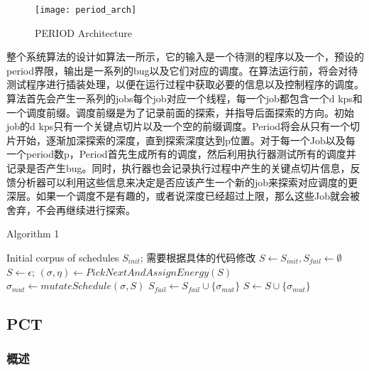 \begin{figure}[ht]
    \centering
    \texttt{[image: period\_arch]}
    \caption{\label{fig:period_arch}PERIOD Architecture}
\end{figure}

整个系统算法的设计如算法一所示，它的输入是一个待测的程序以及一个，预设的period界限，输出是一系列的bug以及它们对应的调度。在算法运行前，将会对待测试程序进行插装处理，以便在运行过程中获取必要的信息以及控制程序的调度。算法首先会产生一系列的jobs每个job对应一个线程，每一个job都包含一个d kps和一个调度前缀。调度前缀是为了记录前面的探索，并指导后面探索的方向。初始job的d kps只有一个关键点切片以及一个空的前缀调度。Period将会从只有一个切片开始，逐渐加深探索的深度，直到探索深度达到p位置。对于每一个Job以及每一个period数p，Period首先生成所有的调度，然后利用执行器测试所有的调度并记录是否产生bug。同时，执行器也会记录执行过程中产生的关键点切片信息，反馈分析器可以利用这些信息来决定是否应该产生一个新的job来探索对应调度的更深层。如果一个调度不是有趣的，或者说深度已经超过上限，那么这些Job就会被舍弃，不会再继续进行探索。

\begin{algorithm}[!ht]
\caption{Algorithm 1}
\label{power}
\begin{algorithmic}[1]
    \REQUIRE  Initial corpus of schedules $S_{init}$; %
    需要根据具体的代码修改
    \STATE $S \leftarrow S_{init}, S_{fail} \leftarrow \emptyset$
     \STATE $S \leftarrow {\epsilon}$;
    \ENDIF
    \REPEAT
        \STATE $(\sigma, \eta) \leftarrow PickNextAndAssignEnergy(S)$
            \STATE $\sigma_{mut} \leftarrow mutateSchedule(\sigma, S)$
             \STATE $S_{fail} \leftarrow S_{fail} \cup \{\sigma_{mut}\}$
            \ENDIF
             \STATE $S \leftarrow S \cup \{\sigma_{mut}\}$
            \ENDIF
        \ENDFOR
\end{algorithmic}  
\end{algorithm}

\subsection{PCT}

\subsubsection{概述}

